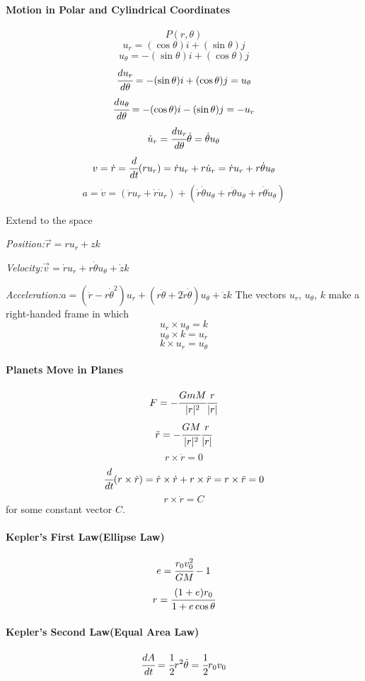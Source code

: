\documentclass{article}
\begin{document}
            \paragraph{Motion in Polar and Cylindrical Coordinates}
                \[P(r,\theta)\]
                \[u_r=(\cos\theta)i+(\sin\theta)j\]
                \[u_\theta=-(\sin\theta)i+(\cos\theta)j\]
                \[\cfrac{du_r}{d\theta}=-(\sin\theta)i+(\cos\theta)j=u_\theta\]
                \[\cfrac{du_\theta}{d\theta}=-(\cos\theta)i-(\sin\theta)j=-u_r\]
                \[\dot{u}_r=\cfrac{du_r}{d\theta}\dot{\theta}=\dot{\theta}u_\theta\]
                \[v=\dot{r}=\cfrac{d}{dt}(ru_r)=\dot{r}u_r+r\dot{u}_r=\dot{r}u_r+r\dot{\theta}u_\theta\]
                \[a=\dot{v}=(\ddot{r}u_r+\dot{r}\dot{u}_r)+(\dot{r}\dot{\theta}u_\theta+r\ddot{\theta}u_\theta+r\dot{\theta}\dot{u}_\theta)\]
                \par Extend to the space
                \par \textit{Position:}\quad $\overrightarrow{r}=ru_r+zk$
                \par \textit{Velocity:}\quad $\overrightarrow{v}=\dot{r}u_r+r\dot{\theta}u_\theta+\dot{z}k$
                \par \textit{Acceleration:}\quad $a=(\ddot{r}-r\dot{\theta}^2)u_r+(r\ddot{\theta}+2\dot{r}\dot{\theta})u_\theta+\ddot{z}k$
                The vectors $u_r$, $u_\theta$, $k$ make a right-handed frame in which
                \[u_r\times u_\theta=k\]
                \[u_\theta\times k=u_r\]
                \[k\times u_r=u_\theta\]
            \paragraph{Planets Move in Planes}
                \[F=-\cfrac{GmM}{|r|^2}\cfrac{r}{|r|}\]
                \[\ddot{r}=-\cfrac{GM}{|r|^2}\cfrac{r}{|r|}\]
                \[r\times\ddot{r}=0\]
                \[\cfrac{d}{dt}(r\times\dot{r})=\dot{r}\times\dot{r}+r\times\ddot{r}=r\times\ddot{r}=0\]
                \[r\times\dot{r}=C\]
                for some constant vector $C$.
            \paragraph{Kepler's First Law(Ellipse Law)}
                \[e=\cfrac{r_0v_0^2}{GM}-1\]
                \[r=\cfrac{(1+e)r_0}{1+e\cos\theta}\]
            \paragraph{Kepler's Second Law(Equal Area Law)}
                \[\cfrac{dA}{dt}=\cfrac{1}{2}r^2\dot{\theta}=\cfrac{1}{2}r_0v_0\]
\end{document}
